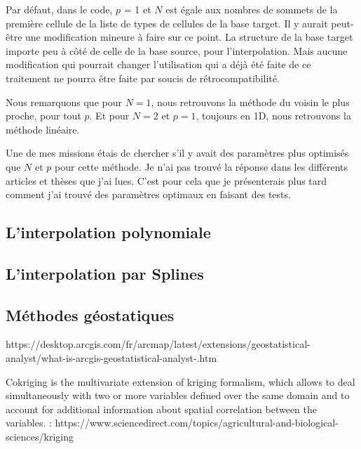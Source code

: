 Par défaut, dans le code, \(p\) = 1 et \(N\) est égale aux nombres de sommets de la première cellule de la liste de types de cellules de la base target. Il y aurait peut-être une modification mineure à faire sur ce point. La structure de la base target importe peu à côté de celle de la base source, pour l'interpolation. Mais aucune modification qui pourrait changer l'utilisation qui a déjà été faite de ce traitement ne pourra être faite par soucis de rétrocompatibilité. %

Nous remarquons que pour \( N = 1 \), nous retrouvons la méthode du voisin le plus proche, pour tout \( p \).
Et pour \( N = 2 \) et \( p = 1 \), toujours en 1D, nous retrouvons la méthode linéaire.

Une de mes missions étais de chercher s'il y avait des paramètres plus optimisés que \(N\) et \(p\) pour cette méthode. Je n'ai pas trouvé la réponse dans les différents articles et thèses que j'ai lues. C'est pour cela que je présenterais plus tard comment j'ai trouvé des paramètres optimaux en faisant des tests.


\subsection{L'interpolation polynomiale}
\subsection{L'interpolation par Splines}
\subsection{Méthodes géostatiques}
https://desktop.arcgis.com/fr/arcmap/latest/extensions/geostatistical-analyst/what-is-arcgis-geostatistical-analyst-.htm

Cokriging is the multivariate extension of kriging formalism, which allows to deal simultaneously with two or more variables defined over the same domain and to account for additional information about spatial correlation between the variables. :
https://www.sciencedirect.com/topics/agricultural-and-biological-sciences/kriging


